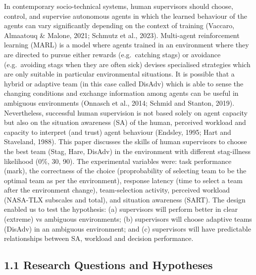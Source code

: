 \documentclass[
]{article}
\begin{document}
In contemporary socio-technical systems, human supervisors should
choose, control, and supervise autonomous agents in which the learned
behaviour of the agents can vary significantly depending on the context
of training (Vaccaro, Almaatouq \& Malone, 2021; Schmutz et al., 2023).
Multi-agent reinforcement learning (MARL) is a model where agents
trained in an environment where they are directed to pursue either
rewards (e.g.~catching stags) or avoidance (e.g.~avoiding stags when
they are often sick) devises specialised strategies which are only
suitable in particular environmental situations. It is possible that a
hybrid or adaptive team (in this case called DisAdv) which is able to
sense the changing conditions and exchange information among agents can
be useful in ambiguous environments (Onnasch et al., 2014; Schmid and
Stanton, 2019). Nevertheless, successful human supervision is not based
solely on agent capacity but also on the situation awareness (SA) of the
human, perceived workload and capacity to interpret (and trust) agent
behaviour (Endsley, 1995; Hart and Staveland, 1988). This paper
discusses the skills of human supervisors to choose the best team (Stag,
Hare, DisAdv) in the environment with different stag-illness likelihood
(0\%, 30, 90). The experimental variables were: task performance (mark),
the correctness of the choice (proprobability of selecting team to be
the optimal team as per the environment), response latency (time to
select a team after the environment change), team-selection activity,
perceived workload (NASA-TLX subscales and total), and situation
awareness (SART). The design enabled us to test the hypothesis: (a)
supervisors will perform better in clear (extreme) vs ambiguous
environments; (b) supervisors will choose adaptive teams (DisAdv) in an
ambiguous environment; and (c) supervisors will have predictable
relationships between SA, workload and decision performance.

\subsection{1.1 Research Questions and
Hypotheses}\label{research-questions-and-hypotheses}
\end{document}
